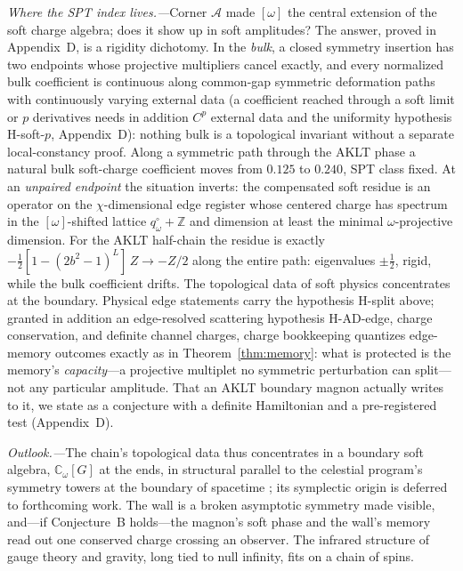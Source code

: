 \documentclass[aps,prl,twocolumn,superscriptaddress,longbibliography,floatfix]{revtex4-2}
\begin{document}
\emph{Where the SPT index lives.---}Corner $\mathcal{A}$ made $[\omega]$
the central extension of the soft charge algebra; does it show up in soft
amplitudes? The answer, proved in Appendix~D, is a rigidity dichotomy.
In the \emph{bulk}, a closed symmetry insertion has two
endpoints whose projective multipliers cancel exactly, and every normalized
bulk coefficient is continuous along common-gap symmetric
deformation paths with continuously varying external data (a coefficient
reached through a soft limit or $p$ derivatives needs in addition $C^p$
external data and the uniformity hypothesis H-soft-$p$,
Appendix~D): nothing bulk is a topological invariant without a
separate local-constancy proof. Along a symmetric path through the AKLT
phase a natural bulk soft-charge coefficient moves from $0.125$ to
$0.240$, SPT class fixed.
At an \emph{unpaired endpoint} the situation inverts: the compensated soft
residue is an operator on the $\chi$-dimensional edge register whose
centered charge has spectrum in the $[\omega]$-shifted lattice
$q^\circ_\omega+\mathbb{Z}$ and dimension at least the minimal
$\omega$-projective dimension. For the AKLT half-chain the residue is
exactly $-\frac{1}{2}[1-(2b^2-1)^L]\,Z\to-Z/2$ along the entire path:
eigenvalues $\pm\frac12$, rigid, while the bulk coefficient drifts. The
topological data of soft physics concentrates at the boundary. Physical
edge statements carry the hypothesis H-split above; granted in addition an
edge-resolved scattering hypothesis H-AD-edge, charge conservation, and
definite channel charges, charge bookkeeping
quantizes edge-memory outcomes exactly as in Theorem~\ref{thm:memory}:
what is protected is the memory's \emph{capacity}---a projective multiplet
no symmetric perturbation can split---not any particular amplitude. That an AKLT boundary magnon
actually writes to it, we state as a conjecture with a definite
Hamiltonian and a pre-registered test (Appendix~D).

\emph{Outlook.---}The chain's topological data thus concentrates in a
boundary soft algebra, $\mathbb{C}_\omega[G]$ at the ends, in structural
parallel to the celestial program's symmetry towers at the boundary of
spacetime \cite{Strominger2017}; its symplectic origin is deferred to
forthcoming work. The wall is a broken asymptotic symmetry
made visible, and---if Conjecture~B holds---the magnon's soft phase and
the wall's memory read out one conserved charge crossing an observer. The
infrared structure of gauge theory and gravity, long tied to null
infinity, fits on a chain of spins.
\end{document}
